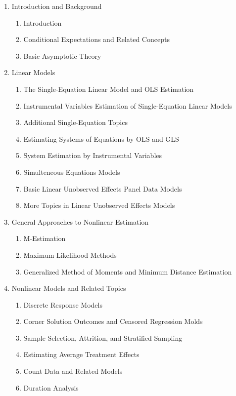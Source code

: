 \documentclass[11pt, oneside, a4paper, article]{article}
\numberwithin{equation}{section}
\begin{document}
\begin{enumerate}[noitemsep, label=\Roman* ]

\item Introduction and Background
\begin{enumerate}[noitemsep, leftmargin = 1em, label=\arabic*.]
\item  Introduction
\item  Conditional Expectations and Related Concepts
\item  Basic Asymptotic Theory
\end{enumerate}

\item Linear Models
\begin{enumerate}[noitemsep, leftmargin = 1em, label=\arabic*.]
\addtocounter{enumii}{3}
\item  The Single-Equation Linear Model and OLS Estimation
\item  Instrumental Variables Estimation of Single-Equation Linear Models
\item  Additional Single-Equation Topics
\item  Estimating Systems of Equations by OLS and GLS
\item  System Estimation by Instrumental Variables
\item  Simulteneous Equations Models
\item  Basic Linear Unobserved Effects Panel Data Models
\item  More Topics in Linear Unobserved Effects Models
\end{enumerate}

\item General Approaches to Nonlinear Estimation
\begin{enumerate}[noitemsep, leftmargin = 1em, label=\arabic*.]
\addtocounter{enumii}{11}
\item  M-Estimation
\item  Maximum Likelihood Methods
\item  Generalized Method of Moments and Minimum Distance Estimation
\end{enumerate}

\item Nonlinear Models and Related Topics
\begin{enumerate}[noitemsep, leftmargin = 1em, label=\arabic*.]
\addtocounter{enumii}{14}
\item  Discrete Response Models
\item  Corner Solution Outcomes and Censored Regression Molds
\item  Sample Selection, Attrition, and Stratified Sampling
\item  Estimating Average Treatment Effects
\item  Count Data and Related Models
\item  Duration Analysis
\end{enumerate}
\end{enumerate}
\end{document}

